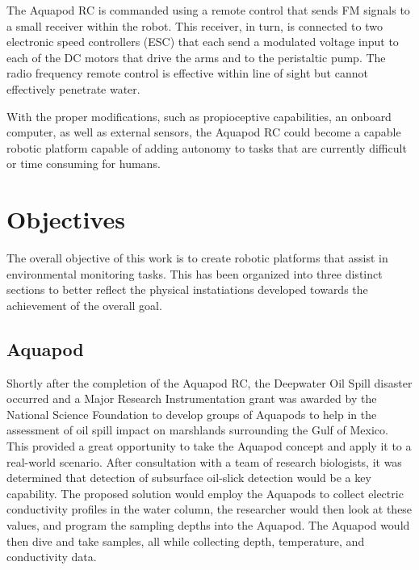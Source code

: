 		The Aquapod RC is commanded using a remote control that sends FM signals to a small receiver within the robot. This receiver, in turn, is connected to two electronic speed controllers (ESC) that each send a modulated voltage input to each of the DC motors that drive the arms and to the peristaltic pump. The radio frequency remote control is effective within line of sight but cannot effectively penetrate water. 

		With the proper modifications, such as propioceptive capabilities, an onboard computer, as well as external sensors, the Aquapod RC could become a capable robotic platform capable of adding autonomy to tasks that are currently difficult or time consuming for humans. 






\section{Objectives}

The overall objective of this work is to create robotic platforms that assist in environmental monitoring tasks. This has been organized into three distinct sections to better reflect the physical instatiations developed towards the achievement of the overall goal. 

\subsection{Aquapod}


Shortly after the completion of the Aquapod RC, the Deepwater Oil Spill disaster occurred and a Major Research Instrumentation grant was awarded by the National Science Foundation to develop groups of Aquapods to help in the assessment of oil spill impact on marshlands surrounding the Gulf of Mexico. This provided a great opportunity to take the Aquapod concept and apply it to a real-world scenario. After consultation with a team of research biologists, it was determined that detection of subsurface oil-slick detection would be a key capability. The proposed solution would employ the Aquapods to collect electric conductivity profiles in the water column, the researcher would then look at these values, and program the sampling depths into the Aquapod. The Aquapod would then dive and take samples, all while collecting depth, temperature, and conductivity data.  

